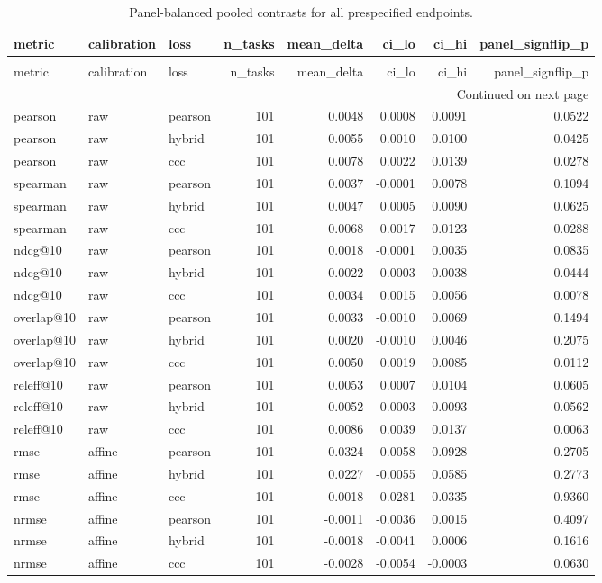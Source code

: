 \begin{longtable}{lllrrrrr}
\caption{Panel-balanced pooled contrasts for all prespecified endpoints.} \label{tab:s-final-pooled} \\
\toprule
metric & calibration & loss & n\_tasks & mean\_delta & ci\_lo & ci\_hi & panel\_signflip\_p \\
\midrule
\endfirsthead
\caption[]{Panel-balanced pooled contrasts for all prespecified endpoints.} \\
\toprule
metric & calibration & loss & n\_tasks & mean\_delta & ci\_lo & ci\_hi & panel\_signflip\_p \\
\midrule
\endhead
\midrule
\multicolumn{8}{r}{Continued on next page} \\
\midrule
\endfoot
\bottomrule
\endlastfoot
pearson & raw & pearson & 101 & 0.0048 & 0.0008 & 0.0091 & 0.0522 \\
pearson & raw & hybrid & 101 & 0.0055 & 0.0010 & 0.0100 & 0.0425 \\
pearson & raw & ccc & 101 & 0.0078 & 0.0022 & 0.0139 & 0.0278 \\
spearman & raw & pearson & 101 & 0.0037 & -0.0001 & 0.0078 & 0.1094 \\
spearman & raw & hybrid & 101 & 0.0047 & 0.0005 & 0.0090 & 0.0625 \\
spearman & raw & ccc & 101 & 0.0068 & 0.0017 & 0.0123 & 0.0288 \\
ndcg@10 & raw & pearson & 101 & 0.0018 & -0.0001 & 0.0035 & 0.0835 \\
ndcg@10 & raw & hybrid & 101 & 0.0022 & 0.0003 & 0.0038 & 0.0444 \\
ndcg@10 & raw & ccc & 101 & 0.0034 & 0.0015 & 0.0056 & 0.0078 \\
overlap@10 & raw & pearson & 101 & 0.0033 & -0.0010 & 0.0069 & 0.1494 \\
overlap@10 & raw & hybrid & 101 & 0.0020 & -0.0010 & 0.0046 & 0.2075 \\
overlap@10 & raw & ccc & 101 & 0.0050 & 0.0019 & 0.0085 & 0.0112 \\
releff@10 & raw & pearson & 101 & 0.0053 & 0.0007 & 0.0104 & 0.0605 \\
releff@10 & raw & hybrid & 101 & 0.0052 & 0.0003 & 0.0093 & 0.0562 \\
releff@10 & raw & ccc & 101 & 0.0086 & 0.0039 & 0.0137 & 0.0063 \\
rmse & affine & pearson & 101 & 0.0324 & -0.0058 & 0.0928 & 0.2705 \\
rmse & affine & hybrid & 101 & 0.0227 & -0.0055 & 0.0585 & 0.2773 \\
rmse & affine & ccc & 101 & -0.0018 & -0.0281 & 0.0335 & 0.9360 \\
nrmse & affine & pearson & 101 & -0.0011 & -0.0036 & 0.0015 & 0.4097 \\
nrmse & affine & hybrid & 101 & -0.0018 & -0.0041 & 0.0006 & 0.1616 \\
nrmse & affine & ccc & 101 & -0.0028 & -0.0054 & -0.0003 & 0.0630 \\
\end{longtable}
